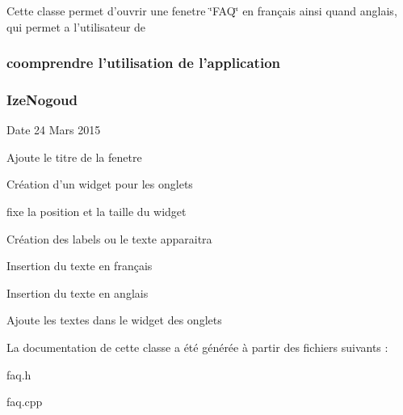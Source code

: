 Cette classe permet d'ouvrir une fenetre \char`\"{}\-F\-A\-Q\char`\"{} en français ainsi quand anglais, qui permet a l'utilisateur de \subsubsection*{coomprendre l'utilisation de l'application }



 

\subsubsection*{Ize\-Nogoud }

\begin{DoxyDate}{Date}
24 Mars 2015 
\end{DoxyDate}
Ajoute le titre de la fenetre

Création d'un widget pour les onglets

fixe la position et la taille du widget

Création des labels ou le texte apparaitra

Insertion du texte en français

Insertion du texte en anglais

Ajoute les textes dans le widget des onglets 

La documentation de cette classe a été générée à partir des fichiers suivants \-:\begin{DoxyCompactItemize}
\item 
faq.\-h\item 
faq.\-cpp\end{DoxyCompactItemize}

